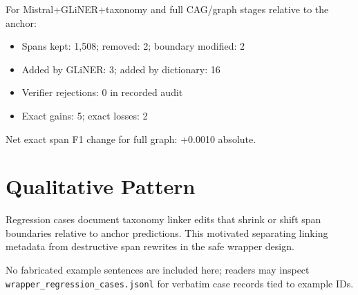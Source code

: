 For Mistral+GLiNER+taxonomy and full CAG/graph stages relative to the anchor:

\begin{itemize}
  \item Spans kept: 1{,}508; removed: 2; boundary modified: 2
  \item Added by GLiNER: 3; added by dictionary: 16
  \item Verifier rejections: 0 in recorded audit
  \item Exact gains: 5; exact losses: 2
\end{itemize}

Net exact span F1 change for full graph: +0.0010 absolute.

\section{Qualitative Pattern}

Regression cases document taxonomy linker edits that shrink or shift span boundaries relative to anchor predictions.
This motivated separating linking metadata from destructive span rewrites in the safe wrapper design.

No fabricated example sentences are included here; readers may inspect \texttt{wrapper\_regression\_cases.jsonl} for verbatim case records tied to example IDs.
